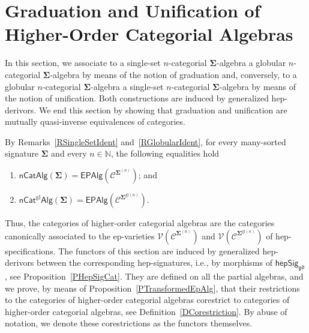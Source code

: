 \documentclass[a4paper, reqno
]{amsart}
\newcommand{\sig}[1]{\mathbf{#1}}             %
\newcommand{\spec}[1]{\boldsymbol{\mathcal{#1}}} %
\newcommand{\gd}{\mathfrak{gd}}              %
\newcommand{\gl}{\mathrm{gl}}                %
\theoremstyle{plain}
\theoremstyle{definition}
\begin{document}
\section{Graduation and Unification of Higher-Order Categorial Algebras}\label{SGraduation}

In this section, we associate to a single-set $n$-categorial $\sig{\Sigma}$-algebra a globular $n$-categorial $\sig{\Sigma}$-algebra by means of the notion of graduation and, conversely, to a globular $n$-categorial $\sig{\Sigma}$-algebra a single-set $n$-categorial $\sig{\Sigma}$-algebra by means of the notion of unification.
Both constructions are induced by generalized hep-derivors.
We end this section by showing that graduation and unification are mutually quasi-inverse equivalences of categories.

By Remarks~\ref{RSingleSetIdent} and~\ref{RGlobularIdent}, for every many-sorted signature $\sig{\Sigma}$ and every $n\in\mathbb{N}$, the following equalities hold
\begin{enumerate}
	\item
	$\mathsf{nCatAlg}(\sig{\Sigma})=\mathsf{EPAlg}(\spec{C}^{\sig{\Sigma}^{(n)}})$; and

	\item
	$\mathsf{nCat}^{\gl}\mathsf{Alg}(\sig{\Sigma})=\mathsf{EPAlg}(\spec{C}^{\sig{\Sigma}^{\gl(n)}})$.
\end{enumerate}
Thus, the categories of higher-order categorial algebras are the categories canonically associated to the ep-varieties $\mathcal{V}(\spec{C}^{\sig{\Sigma}^{(n)}})$ and $\mathcal{V}(\spec{C}^{\sig{\Sigma}^{\gl(n)}})$ of hep-specifications.
The functors of this section are induced by generalized hep-derivors between the corresponding hep-signatures, i.e., by morphisms of $\mathsf{hepSig}_{\gd}$, see Proposition~\ref{PHepSigCat}.
They are defined on all the partial algebras, and we prove, by means of Proposition~\ref{PTransformedEpAlg}, that their restrictions to the categories of higher-order categorial algebras corestrict to categories of higher-order categorial algebras, see Definition~\ref{DCorestriction}.
By abuse of notation, we denote these corestrictions as the functors themselves.
\end{document}
